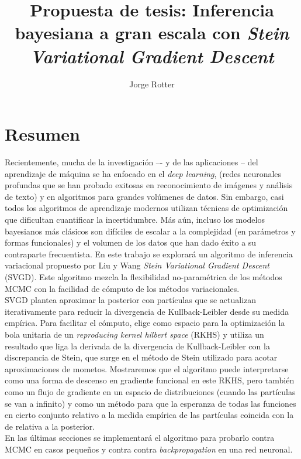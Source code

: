 \documentclass[11pt]{article}
\begin{document}
\title{Propuesta de tesis: Inferencia bayesiana a gran escala con \textit{Stein Variational Gradient Descent}}
\author{Jorge Rotter}
\maketitle

\section{Resumen}

Recientemente, mucha de la investigación –- y de las aplicaciones --  del aprendizaje de máquina se ha enfocado en el \textit{deep learning}, (redes neuronales profundas que se han probado exitosas en reconocimiento de imágenes y análisis de texto) y en algoritmos para grandes volúmenes de datos. Sin embargo, casi todos los algoritmos de aprendizaje modernos utilizan técnicas de optimización  que dificultan cuantificar la incertidumbre. Más aún, incluso los modelos bayesianos más clásicos son difíciles de escalar a la complejidad (en parámetros y formas funcionales) y el volumen de los datos que han dado éxito a su contraparte frecuentista. En este trabajo se explorará un algoritmo de inferencia variacional propuesto por Liu y Wang \textit{Stein Variational Gradient Descent} (SVGD). Este algoritmo mezcla la flexibilidad no-paramétrica de los métodos MCMC con la facilidad de cómputo de los métodos variacionales. \\

SVGD plantea aproximar la posterior con partículas que se actualizan iterativamente para reducir la divergencia de Kullback-Leibler desde su medida empírica. Para facilitar el cómputo, elige como espacio para la optimización la bola unitaria de un \textit{reproducing kernel hilbert space} (RKHS) y utiliza un resultado que liga la derivada de la divergencia de Kullback-Leibler con la discrepancia de Stein, que surge en el método de Stein utilizado para acotar aproximaciones de mometos. Mostraremos que el algoritmo puede interpretarse como una forma de descenso en gradiente funcional en este RKHS, pero también como un flujo de gradiente en un espacio de distribuciones (cuando las partículas se van a infinito) y como un método para que la esperanza de todas las funciones en cierto conjunto relativo a la medida empírica de las partículas coincida con la de relativa a la posterior. \\

En las últimas secciones se implementará el algoritmo para probarlo contra MCMC en casos pequeños y contra contra \textit{backpropagation} en una red neuronal. 
\end{document}
